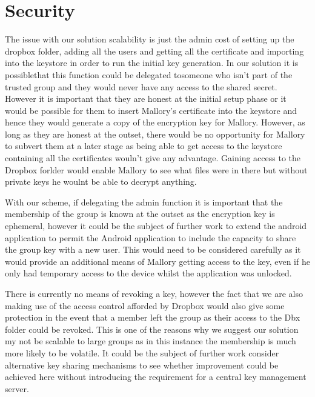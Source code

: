 
\chapter{Security}
\label{cha:security}
The issue with our solution scalability is just the admin cost of setting up the dropbox folder, adding all the users and getting all the certificate and importing into the keystore in order to run the initial key generation.  In our solution it is possiblethat this function could be delegated tosomeone who isn’t part of the trusted group and they would never have any access to the shared secret.  However it is important that they are honest at the initial setup phase or it would be possible for them to insert Mallory’s certificate into the keystore and hence they would generate a copy of the encryption key for Mallory.  However, as long as they are honest at the outset, there would be no opportunity for Mallory to subvert them at a later stage as being able to get access to the keystore containing all the certificates wouln’t give any advantage.  Gaining access to the Dropbox forlder would enable Mallory to see what files were in there but without private keys he woulnt be able to decrypt anything.


With our scheme, if delegating the admin function it is important that the membership of the group is known at the outset as the encryption key is ephemeral, however it could be the subject of further work to extend the android application to permit the Android application to include the capacity to share the group key with a new user.  This would need to be considered carefully as it would provide an additional means of Mallory getting access to the key, even if he only had temporary access to the device whilst the application was unlocked.  

There is currently no means of revoking a key, however the fact that we are also making use of the access control afforded by Dropbox would also give some protection in the event that a member left the group as their access to the Dbx folder could be revoked.  This is one of the reasons why we suggest our solution my not be scalable to large groups as in this instance the membership is much more likely to be volatile.  It could be the subject of further work consider alternative key sharing mechanisms to see whether improvement could be achieved here without introducing the requirement for a central key management server.

